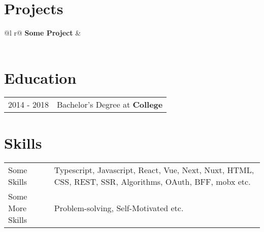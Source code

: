 \documentclass[a4paper,12pt]{article}
\begin{document}
\section{Projects}

\begin{tabularx}{\linewidth}{ @{}l r@{} }
\textbf{Some Project} & \hfill \href{}{} \\[3.75pt]
  \\
\end{tabularx}

\section{Education}
\begin{tabularx}{\linewidth}{@{}l X@{}}	
2014 - 2018 & Bachelor’s Degree at \textbf{College} \hfill \normalsize  \\
\end{tabularx}

\section{Skills}
\begin{tabularx}{\linewidth}{@{}l X@{}}
Some Skills &  \normalsize{Typescript, Javascript, React, Vue, Next, Nuxt, HTML, CSS, REST, SSR, Algorithms, OAuth, BFF, mobx etc.}\\
Some More Skills  &  \normalsize{Problem-solving, Self-Motivated etc.}\\  
\end{tabularx}

\vfill
{}
\end{document}
